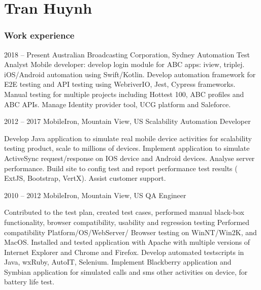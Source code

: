 \documentclass{tccv}
\begin{document}
\part{Tran Huynh}

\section{Work experience}

\begin{eventlist}

\item{2018 -- Present}
     {Australian Broadcasting Corporation, Sydney}
     {Automation Test Analyst}
\newline  Mobile developer: develop login module for ABC apps: iview, triplej.
\newline iOS/Android automation using Swift/Kotlin.
\newline Develop automation framework for E2E testing and API testing using WebriverIO, Jest, Cypress frameworks.
\newline Manual testing for multiple projects including Hottest 100, ABC profiles and ABC APIs.
\newline Manage Identity provider tool, UCG platform and Saleforce. 
\newline
\item{2012 -- 2017}
     {MobileIron, Mountain View, US}
     {Scalability Automation Developer}

Develop Java application to simulate real mobile device
activities for scalability testing product, scale to millions
of devices.
Implement application to simulate ActiveSync request/response on IOS device and Android devices.
Analyse server performance.
\newline Build site to config test and report performance test results
 ( ExtJS, Bootstrap, VertX).
\newline Assist customer support.

\item{2010 -- 2012}
     {MobileIron, Mountain View, US}
     {QA Engineer}

Contributed to the test plan, created test cases,
  performed manual black-box functionality, browser
  compatibility, usability and regression testing
\newline Performed compatibility Platform/OS/WebServer/
\newline Browser testing on WinNT/Win2K, and MacOS.
  Installed and tested application with Apache with
  multiple versions of Internet Explorer and Chrome and Firefox.
\newline Develop automated testscripts in Java, wxRuby, AutoIT, Selenium.
\newline Implement Blackberry application and Symbian application for simulated
calls and sms other activities on device, for battery life test.


\end{eventlist}
\end{document}
